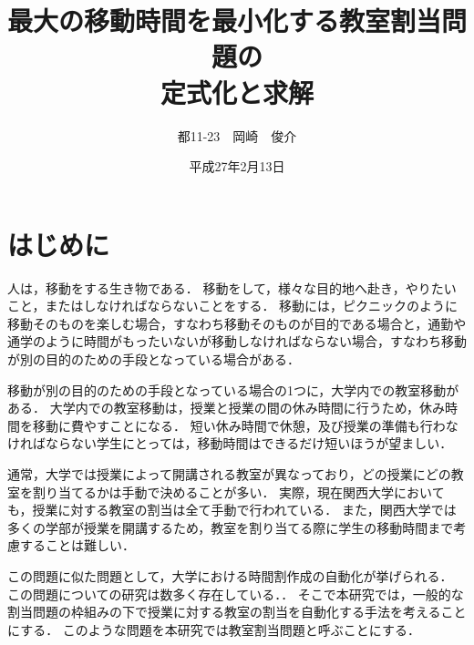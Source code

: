 \documentclass[12pt, a4paper, fleqn]{jreport}
\title{最大の移動時間を最小化する教室割当問題の\\定式化と求解}
\author{都11-23　岡崎　俊介}
\date{平成27年2月13日}
\begin{document}
\maketitle
\setcounter{tocdepth}{2}
\setlength{\mathindent}{0zw}
\tableofcontents
\newpage
{}
\setcounter{totalnumber}{3}
\setcounter{topnumber}{3}
\renewcommand{\topfraction}{0.99}
\renewcommand{\bottomfraction}{0.99}
\renewcommand{\textfraction}{0.0}


\setlength{\textwidth}{\paperwidth}   %
\addtolength{\textwidth}{-2in}         %
\setlength{\textheight}{\paperheight} %
\addtolength{\textheight}{-2in}        %
\setlength{\topmargin}{0pt}            %
\addtolength{\topmargin}{-\headheight} %
\addtolength{\topmargin}{-\headsep}    %
\setlength{\oddsidemargin}{0pt}       %
\setlength{\evensidemargin}{0pt}      %



\chapter{はじめに}
人は，移動をする生き物である．
移動をして，様々な目的地へ赴き，やりたいこと，またはしなければならないことをする．
移動には，ピクニックのように移動そのものを楽しむ場合，すなわち移動そのものが目的である場合と，通勤や通学のように時間がもったいないが移動しなければならない場合，すなわち移動が別の目的のための手段となっている場合がある．

移動が別の目的のための手段となっている場合の1つに，大学内での教室移動がある．
大学内での教室移動は，授業と授業の間の休み時間に行うため，休み時間を移動に費やすことになる．
短い休み時間で休憩，及び授業の準備も行わなければならない学生にとっては，移動時間はできるだけ短いほうが望ましい．

通常，大学では授業によって開講される教室が異なっており，どの授業にどの教室を割り当てるかは手動で決めることが多い．
実際，現在関西大学においても，授業に対する教室の割当は全て手動で行われている．
また，関西大学では多くの学部が授業を開講するため，教室を割り当てる際に学生の移動時間まで考慮することは難しい．

この問題に似た問題として，大学における時間割作成の自動化が挙げられる．
この問題についての研究は数多く存在している．\cite{dadasenko,dadasan}．
そこで本研究では，一般的な割当問題\cite{ハンドブック}の枠組みの下で授業に対する教室の割当を自動化する手法を考えることにする．
このような問題を本研究では教室割当問題と呼ぶことにする．
\end{document}

